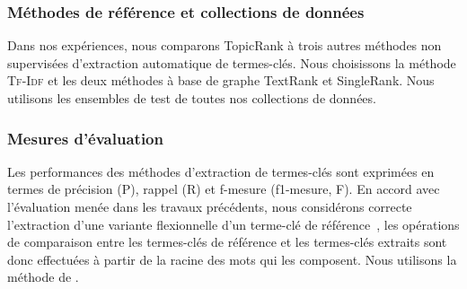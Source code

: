       \subsubsection{Méthodes de référence et collections de données}
      \label{subsubsec:main:domain_independent_keyphrase_extraction-unsupervised_automatic_keyphrase_extraction-evaluation-baselines}
        Dans nos expériences, nous comparons TopicRank à trois autres
        méthodes non supervisées d'extraction automatique de termes-clés. Nous
        choisissons la méthode \textsc{Tf-Idf} et les deux méthodes à base de
        graphe TextRank et SingleRank. Nous utilisons les ensembles de test de
        toutes nos collections de données.

      \subsubsection{Mesures d'évaluation}
      \label{subsubsec:main:domain_independent_keyphrase_extraction-unsupervised_automatic_keyphrase_extraction-evaluation-evaluation_measures}
        Les performances des méthodes d'extraction de termes-clés sont exprimées
        en termes de précision (P), rappel (R) et f-mesure (f1-mesure, F). En
        accord avec l'évaluation menée dans les travaux précédents, nous
        considérons correcte l'extraction d'une variante flexionnelle d'un
        terme-clé de référence~\cite{kim2010semeval}, les opérations de
        comparaison entre les termes-clés de référence et les termes-clés
        extraits sont donc effectuées à partir de la racine des mots qui les
        composent. Nous utilisons la méthode de
        .

